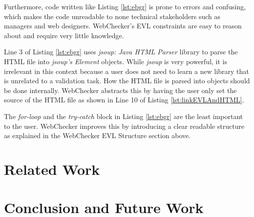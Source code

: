 \documentclass[conference]{IEEETran}
\begin{document}
Furthermore, code written like Listing \ref{lst:ebgr} is prone to errors and confusing, which makes the code unreadable to none technical stakeholders such as managers and web designers. WebChecker's EVL constraints are easy to reason about and require very little knowledge. 

Line 3 of Listing \ref{lst:ebgr} uses \textit{jsoup: Java HTML Parser}\cite{jsoup} library to parse the HTML file into \textit{jsoup's Element} objects. While \textit{jsoup} is very powerful, it is irrelevant in this context because a user does not need to learn a new library that is unrelated to a validation task. How the HTML file is parsed into objects should be done internally. WebChecker abstracts this by having the user only set the source of the HTML file as shown in Line 10 of Listing \ref{lst:linkEVLAndHTML}.           


The \textit{for-loop} and the \textit{try-catch} block in Listing \ref{lst:ebgr} are the least important to the user. WebChecker improves this by introducing a clear readable structure as explained in the WebChecker EVL Structure section above.  




\section{Related Work}


\section{Conclusion and Future Work}


 

\end{document}

